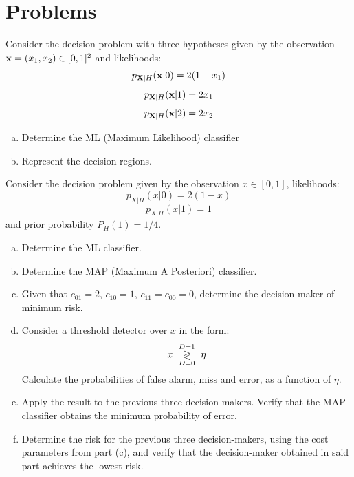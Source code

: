\section{Problems}

%
\begin{prob}
\label{MAPmulticlas}

Consider the decision problem with three hypotheses given by the observation ${\bf x}=(x_1,x_2) \in [0,1]^2$ and likelihoods:
\begin{equation}
p_{{\bf X}|H}({\bf x}|0) = 2(1-x_1)
\end{equation}
\begin{equation}
p_{{\bf X}|H}({\bf x}|1) = 2 x_1
\end{equation}
\begin{equation}
p_{{\bf X}|H}({\bf x}|2) = 2 x_2
\end{equation}

\begin{enumerate}[a)]
\item Determine the ML (Maximum Likelihood) classifier
\item Represent the decision regions.
\end{enumerate}
\end{prob}


\begin{prob}
\label{PFAPMPE}

Consider the decision problem given by the observation $x \in [0,1]$, likelihoods:
\begin{equation}
p_{X|H}(x|0) = 2(1-x)
\end{equation}
\begin{equation}
p_{X|H}(x|1) = 1
\end{equation}
and prior probability $P_H(1)=1/4$.

\begin{enumerate}[a)]
\item Determine the ML classifier.
\item Determine the MAP (Maximum A Posteriori) classifier.
\item Given that $c_{01}=2$, $c_{10}=1$, $c_{11}=c_{00}=0$, determine the decision-maker of minimum risk.
\item Consider a threshold detector over $x$ in the form:
\begin{equation}
x \,\, \underset{D=0}{\overset{D=1}{\gtrless}}\,\, \eta
\end{equation}
Calculate the probabilities of false alarm, miss and error, as a function of $\eta$.
\item Apply the result to the previous three decision-makers. Verify that the MAP classifier obtains the minimum probability of error.
\item Determine the risk for the previous three decision-makers, using the cost parameters from part (c), and verify that the decision-maker obtained in said part achieves the lowest risk.
\end{enumerate}

\end{prob}



